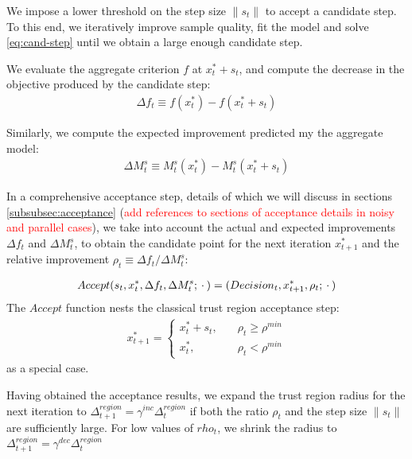 We impose a lower threshold on the step size $\lVert s_t\rVert$ to accept a candidate step. To this end, we iteratively improve sample quality, fit the model and solve \ref{eq:cand-step} until we obtain a large enough candidate step.

We evaluate the aggregate criterion $f$ at $x^{*}_t+s_t$, and compute the decrease in the objective produced by the candidate step:
\begin{align}
    \Delta f_t\equiv f(x_t^*) - f(x_t^*+s_t)
    \label{eq:actual-improvement}
\end{align}

Similarly, we compute the expected improvement predicted my the aggregate model:
\begin{align}
    \Delta M^{s}_t\equiv M_t^s(x_t^*) - M_t^s(x_t^*+s_t)
    \label{eq:expected-improvement}
\end{align}

In a comprehensive acceptance step, details of which we will discuss in sections \ref{subsubsec:acceptance} (\textcolor{red}{add references to sections of acceptance details in noisy and parallel cases}), we take into account the actual and expected improvements $\Delta f_t$ and $\Delta M_t^s$, to obtain the candidate point for the next iteration $x_{t+1}^*$ and the relative improvement $\rho_t\equiv \Delta f_t/ \Delta M^s_t$:

\begin{align}
    Accept(s_t,x_t^{*},\Delta f_t,\Delta M_t^s;\hspace{0.2em}\cdot\hspace{0.2em})=(Decision_t,x_{t+1}^{*},\rho_t;\hspace{0.2em}\cdot\hspace{0.2em})
    \label{eq:acceptance-core}
\end{align}
The $Accept$ function nests the classical trust region acceptance step:
\begin{align}
    x_{t+1}^*=\begin{cases}
        x_t^*+s_t,\quad&\rho_t\geq\rho^{min}\\
        x_t^*,\quad&\rho_t<\rho^{min}
    \end{cases}
    \label{eq:accept-classic}
\end{align}
as a special case.

Having obtained the acceptance results, we expand the trust region radius for the next iteration to $\Delta_{t+1}^{region}=\gamma^{inc}\Delta_t^{region}$ if both the ratio $\rho_t$ and the step size $\lVert s_t\rVert$ are sufficiently large. For low values of $rho_t$, we shrink the radius to $\Delta^{region}_{t+1} = \gamma^{dec}\Delta_t^{region}$

